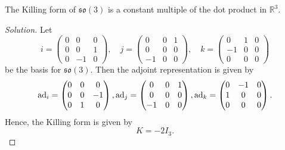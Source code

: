 \documentclass{report}
\begin{document}
\begin{exercise}[Exercise I.5]\label{ex:so_3_killing_form}
    The Killing form of $\mathfrak{so}(3)$ is a constant multiple of the dot product in $\mathbb R^3$.    
\end{exercise}
\begin{proof}[Solution]
    Let
    \[
    i = \begin{pmatrix}
        0 & 0 & 0\\
        0 & 0 & 1\\
        0 & -1 & 0
    \end{pmatrix}, \quad j = \begin{pmatrix}
        0 & 0 & 1\\
        0 & 0 & 0\\
        -1 & 0 & 0
    \end{pmatrix}, \quad k = \begin{pmatrix}
        0 & 1 & 0\\
        -1 & 0 & 0\\
        0 & 0 & 0
    \end{pmatrix}
    \]
    be the basis for $\mathfrak{so}(3)$.
    Then the adjoint representation is given by
    \[
    \operatorname{ad}_i = \begin{pmatrix}
        0 & 0 & 0\\
        0 & 0 & -1\\
        0 & 1 & 0
    \end{pmatrix},
    \operatorname{ad}_j = \begin{pmatrix}
        0 & 0 & 1\\
        0 & 0 & 0\\
        -1 & 0 & 0
    \end{pmatrix},
    \operatorname{ad}_k = \begin{pmatrix}
        0 & -1 & 0\\
        1 & 0 & 0\\
        0 & 0 & 0
    \end{pmatrix}.
    \]
    Hence, the Killing form is given by
    \[
    K = -2I_3.
    \]
\end{proof}
\end{document}
